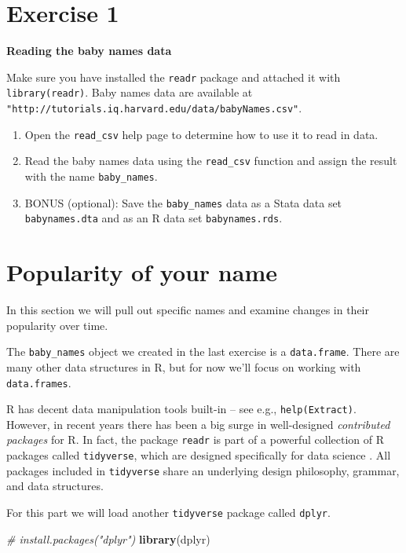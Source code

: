\documentclass[]{book}
\newenvironment{Shaded}{\begin{snugshade}}{\end{snugshade}}
\newcommand{\KeywordTok}[1]{\textcolor[rgb]{0.13,0.29,0.53}{\textbf{#1}}}
\newcommand{\CommentTok}[1]{\textcolor[rgb]{0.56,0.35,0.01}{\textit{#1}}}
\newcommand{\NormalTok}[1]{#1}
\begin{document}
\section{Exercise 1}\label{exercise-1}

\textbf{Reading the baby names data}

Make sure you have installed the \texttt{readr} package and attached it
with \texttt{library(readr)}. Baby names data are available at
\texttt{"http://tutorials.iq.harvard.edu/data/babyNames.csv"}.

\begin{enumerate}
\def\labelenumi{\arabic{enumi}.}
\item
  Open the \texttt{read\_csv} help page to determine how to use it to
  read in data.
\item
  Read the baby names data using the \texttt{read\_csv} function and
  assign the result with the name \texttt{baby\_names}.
\item
  BONUS (optional): Save the \texttt{baby\_names} data as a Stata data
  set \texttt{babynames.dta} and as an R data set
  \texttt{babynames.rds}.
\end{enumerate}

\section{Popularity of your name}\label{popularity-of-your-name}

In this section we will pull out specific names and examine changes in
their popularity over time.

The \texttt{baby\_names} object we created in the last exercise is a
\texttt{data.frame}. There are many other data structures in R, but for
now we'll focus on working with \texttt{data.frames}.

R has decent data manipulation tools built-in -- see e.g.,
\texttt{help(Extract)}. However, in recent years there has been a big
surge in well-designed \emph{contributed packages} for R. In fact, the
package \texttt{readr} is part of a powerful collection of R packages
called \texttt{tidyverse}, which are designed specifically for data
science . All packages included in \texttt{tidyverse} share an
underlying design philosophy, grammar, and data structures.

For this part we will load another \texttt{tidyverse} package called
\texttt{dplyr}.

\begin{Shaded}
\begin{Highlighting}[]
\CommentTok{# install.packages("dplyr")}
\KeywordTok{library}\NormalTok{(dplyr)}
\end{Highlighting}
\end{Shaded}
\end{document}
